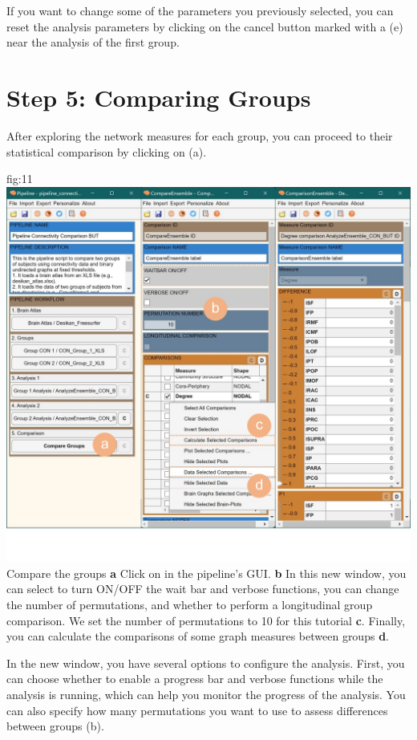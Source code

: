 \documentclass[justified]{tufte-handout}
\begin{document}
If you want to change some of the parameters you previously selected, you can reset the analysis parameters by clicking on the cancel button marked with a  (e) near the analysis of the first group.
 
\clearpage
\section{Step 5: Comparing Groups}

After exploring the network measures for each group, you can proceed to their statistical comparison by clicking on  (a).

	{fig:11}
	{
	\includegraphics{fig11.jpg}
	}
	{Compare the groups}
	{
	{\bf a} Click on  in the pipeline's GUI.
	{\bf b} In this new window, you can select to turn ON/OFF the wait bar and verbose functions, you can change the number of permutations, and whether to perform a longitudinal group comparison. We set the number of permutations to 10 for this tutorial {\bf c}. Finally, you can calculate the comparisons of some graph measures between groups {\bf d}.
	}
	
In the new window, you have several options to configure the analysis. First, you can choose whether to enable a progress bar and verbose functions while the analysis is running, which can help you monitor the progress of the analysis. You can also specify how many permutations you want to use to assess differences between groups (b).
\end{document}
